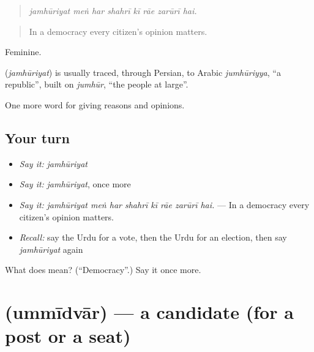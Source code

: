 \begin{quote}
       
\end{quote}

\begin{quote}
\emph{jamhūriyat meṅ har shahrī kī rāe zarūrī hai.}
\end{quote}

\begin{quote}
In a democracy every citizen's opinion matters.
\end{quote}

Feminine.

\begin{cousinweb}
\textbf{} (\emph{jamhūriyat}) is usually traced, through Persian, to Arabic \emph{jumhūriyya}, \textquotedblleft{}a republic\textquotedblright{}, built on \emph{jumhūr}, \textquotedblleft{}the people at large\textquotedblright{}.
\end{cousinweb}

\begin{grammarlens}[title={What you've built}]
One more word for giving reasons and opinions.
\end{grammarlens}

\subsection*{Your turn}
\begin{itemize}
\raggedright
  \item \emph{Say it:} \emph{jamhūriyat}
  \item \emph{Say it:} \emph{jamhūriyat}, once more
  \item \emph{Say it:} \emph{jamhūriyat meṅ har shahrī kī rāe zarūrī hai.} — In a democracy every citizen's opinion matters.
  \item \emph{Recall:} say the Urdu for a vote, then the Urdu for an election, then say \emph{jamhūriyat} again
\end{itemize}

\begin{tcolorbox}[breakable,colback=teal!4,colframe=teal!35!black,title={Before you move on}]
What does  mean? (\textquotedblleft{}Democracy\textquotedblright{}.) Say it once more.
\end{tcolorbox}
\section[\texorpdfstring{\ur{امیدوار} (ummīdvār)}{امیدوار (ummīdvār)}]{ (ummīdvār) — a candidate (for a post or a seat)}

